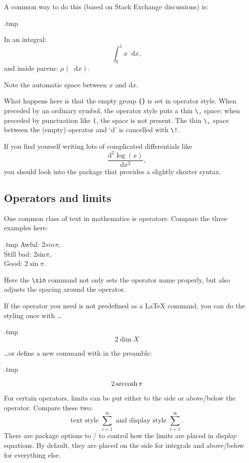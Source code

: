 A common way to do this (based on Stack Exchange discussions) is:
%
\begin{VerbatimOut}{\jobname.tmp}
\newcommand{\diff}{\mathop{}\!\mathrm{d}}

In an integral:
\[
\int_0^1 x \diff x,
\]
and inside parens: $\mu(\diff x)$.
\end{VerbatimOut}
\ShowExample
%
Note the automatic space between $x$ and $\mathrm dx$.

What happens here is that the empty group \verb|{}| is set in operator style.
When preceded by an ordinary symbol, the operator style puts a thin \verb|\,| space;
when preceded by punctuation like \verb|(|, the space is not present.
The thin \verb|\,| space between the (empty) operator and `d' is cancelled with \verb|\!|.

If you find yourself writing lots of complicated differentials like
\[
\frac{\mathrm d^2 \log(x)}{\mathrm dx^2},
\]
you should look into the  package
that provides a slightly shorter syntax.


%
%
\subsection{Operators and limits}\label{sec:operators}
One common class of text in mathematics is operators.
Compare the three examples here:
%
\begin{VerbatimOut}{\jobname.tmp}
Awful: $2 sin \pi$,\\
Still bad: $2 \textrm{sin} \pi$,\\
Good: $2 \sin \pi$.
\end{VerbatimOut}
\ShowExample
Here the \verb|\sin| command not only sets the operator name properly,
but also adjusts the spacing around the operator.

If the operator you need is not predefined as a \LaTeX{} command,
you can do the styling once with \dots
%
\begin{VerbatimOut}{\jobname.tmp}
\[
2 \operatorname{dim} X
\]
\end{VerbatimOut}
\ShowExample
%
\dots{}or define a new command with  in the preamble:
%
\begin{VerbatimOut}{\jobname.tmp}

\[
2 \operatorname{arccosh} \pi
\]
\end{VerbatimOut}
\ShowExample

For certain operators, limits can be put either to the side or above/below the operator.
Compare these two:
\[
\text{text style }\textstyle \sum_{i=1}^\infty
\text{ and display style }\displaystyle \sum_{i=1}^\infty.
\]
There are package options to /
to control how the limits are placed in display equations.
By default, they are placed on the side for integrals and above/below for everything else.


